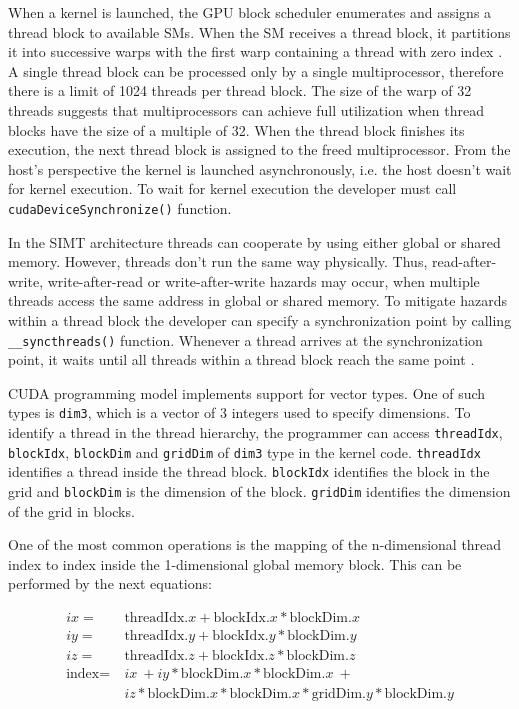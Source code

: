 When a kernel is launched, the GPU block scheduler enumerates and assigns a thread block to available SMs.
When the SM receives a thread block, it partitions it into successive warps with the first warp containing a thread with zero index \cite{CUDAProgramming}.
A single thread block can be processed only by a single multiprocessor, therefore there is a limit of 1024 threads per thread block.
The size of the warp of 32 threads suggests that multiprocessors can achieve full utilization when thread blocks have the size of a multiple of 32.
When the thread block finishes its execution, the next thread block is assigned to the freed multiprocessor.
From the host's perspective the kernel is launched asynchronously, i.e. the host doesn't wait for kernel execution.
To wait for kernel execution the developer must call \texttt{cudaDeviceSynchronize()} function.

In the SIMT architecture threads can cooperate by using either global or shared memory.
However, threads don't run the same way physically.
Thus, read-after-write, write-after-read or write-after-write hazards may occur, when multiple threads access the same address in global or shared memory.
To mitigate hazards within a thread block the developer can specify a synchronization point by calling \texttt{\_\_syncthreads()} function.
Whenever a thread arrives at the synchronization point, it waits until all threads within a thread block reach the same point \cite{CUDAProgramming}.

CUDA programming model implements support for vector types.
One of such types is \texttt{dim3}, which is a vector of 3 integers used to specify dimensions.
To identify a thread in the thread hierarchy, the programmer can access \texttt{threadIdx}, \texttt{blockIdx}, \texttt{blockDim} and \texttt{gridDim} of \texttt{dim3} type in the kernel code.
\texttt{threadIdx} identifies a thread inside the thread block.
\texttt{blockIdx} identifies the block in the grid and \texttt{blockDim} is the dimension of the block.
\texttt{gridDim} identifies the dimension of the grid in blocks.

One of the most common operations is the mapping of the n-dimensional thread index to index inside the 1-dimensional global memory block.
This can be performed by the next equations:

\begin{equation}
\begin{aligned}
ix =\ & \text{threadIdx}.x + \text{blockIdx}.x * \text{blockDim}.x \\
iy =\ &\text{threadIdx}.y + \text{blockIdx}.y * \text{blockDim}.y \\
iz =\ &\text{threadIdx}.z + \text{blockIdx}.z * \text{blockDim}.z \\
\text{index} =\ &ix\ + iy * \text{blockDim}.x * \text{blockDim}.x\ + \\
 &iz * \text{blockDim}.x * \text{blockDim}.x * \text{gridDim}.y * \text{blockDim}.y
\end{aligned}
\end{equation}

